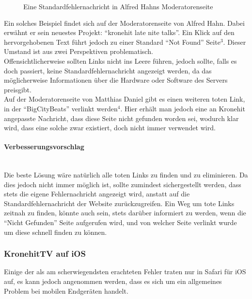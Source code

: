 \documentclass{article}
\newcommand{\paragraphlb}[1]{\paragraph{#1}\mbox{}\\}
\begin{document}
\begin{figure}
\begin{center}
			\caption{Eine Standardfehlernachricht in Alfred Hahns Moderatorenseite}
		\end{center}
	\end{figure}
	Ein solches Beispiel findet sich auf der Moderatorenseite von Alfred Hahn. Dabei erwähnt er sein neuestes Projekt: \enquote{kronehit late nite talks}. Ein Klick auf den hervorgehobenen Text führt jedoch zu einer Standard \enquote{Not Found} Seite\hyperref[sec:Anhang4]{$^3$}\label{ssub:notfound1}. Dieser Umstand ist aus zwei Perspektiven problematisch. \\

	Offensichtlicherweise sollten Links nicht ins Leere führen, jedoch sollte, falls es doch passiert, keine Standardfehlernachricht angezeigt werden, da das möglicherweise Informationen über die Hardware oder Software des Servers preisgibt. \\

	Auf der Moderatorenseite von Matthias Daniel gibt es einen weiteren toten Link, in der \enquote{BigCityBeats} verlinkt werden\hyperref[sec:Anhang5]{$^4$}\label{ssub:notfound2}. Hier erhält man jedoch eine an Kronehit angepasste Nachricht, dass diese Seite nicht gefunden worden sei, wodurch klar wird, dass eine solche zwar existiert, doch nicht immer verwendet wird.
	\paragraphlb{Verbesserungsvorschlag}
	Die beste Lösung wäre natürlich alle toten Links zu finden und zu eliminieren. Da dies jedoch nicht immer möglich ist, sollte zumindest sichergestellt werden, dass stets die eigene Fehlernachricht angezeigt wird, anstatt auf die Standardfehlernachricht der Website zurückzugreifen. Ein Weg um tote Links zeitnah zu finden, könnte auch sein, stets darüber informiert zu werden, wenn die \enquote{Nicht Gefunden} Seite aufgerufen wird, und von welcher Seite verlinkt wurde um diese schnell finden zu können.
	\subsubsection{KronehitTV auf iOS}
	Einige der als am scherwiegendsten erachteten Fehler traten nur in Safari für iOS auf, es kann jedoch angenommen werden, dass es sich um ein allgemeines Problem bei mobilen Endgeräten handelt. \\
\end{document}
